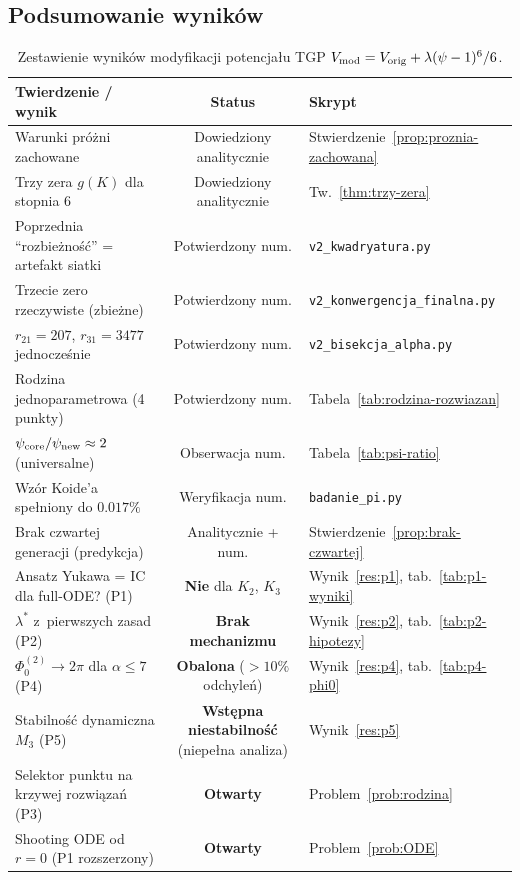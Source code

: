 \subsection{Podsumowanie wyników}%
\label{app:I-podsumowanie}

\begin{table}[h]
\centering
\small
\caption{Zestawienie wyników modyfikacji potencjału TGP
  $V_{\rm mod} = V_{\rm orig} + \lambda(\psi-1)^6/6$.}
\label{tab:podsumowanie-v2}
\begin{tabular}{@{}p{6.5cm}c p{4.5cm}@{}}
\toprule
\textbf{Twierdzenie / wynik} & \textbf{Status} & \textbf{Skrypt} \\
\midrule
Warunki próżni zachowane & Dowiedziony analitycznie
    & Stwierdzenie~\ref{prop:proznia-zachowana} \\
Trzy zera $g(K)$ dla stopnia 6 & Dowiedziony analitycznie
    & Tw.~\ref{thm:trzy-zera} \\
Poprzednia ``rozbieżność'' = artefakt siatki
    & Potwierdzony num.
    & \texttt{v2\_kwadryatura.py} \\
Trzecie zero rzeczywiste (zbieżne)
    & Potwierdzony num.
    & \texttt{v2\_konwergencja\_finalna.py} \\
$r_{21} = 207$, $r_{31} = 3477$ jednocześnie
    & Potwierdzony num.
    & \texttt{v2\_bisekcja\_alpha.py} \\
Rodzina jednoparametrowa (4 punkty)
    & Potwierdzony num.
    & Tabela~\ref{tab:rodzina-rozwiazan} \\
$\psi_{\rm core}/\psi_{\rm new} \approx 2$ (universalne)
    & Obserwacja num.
    & Tabela~\ref{tab:psi-ratio} \\
Wzór Koide'a spełniony do $0.017\%$
    & Weryfikacja num.
    & \texttt{badanie\_pi.py} \\
Brak czwartej generacji (predykcja)
    & Analitycznie + num.
    & Stwierdzenie~\ref{prop:brak-czwartej} \\
\midrule
Ansatz Yukawa = IC dla full-ODE? (P1)
    & \textbf{Nie} dla $K_2$, $K_3$
    & Wynik~\ref{res:p1}, tab.~\ref{tab:p1-wyniki} \\
$\lambda^*$ z~pierwszych zasad (P2)
    & \textbf{Brak mechanizmu}
    & Wynik~\ref{res:p2}, tab.~\ref{tab:p2-hipotezy} \\
$\Phi_0^{(2)} \to 2\pi$ dla $\alpha \leq 7$ (P4)
    & \textbf{Obalona} ($>10\%$ odchyleń)
    & Wynik~\ref{res:p4}, tab.~\ref{tab:p4-phi0} \\
Stabilność dynamiczna $M_3$ (P5)
    & \textbf{Wstępna niestabilność} (niepełna analiza)
    & Wynik~\ref{res:p5} \\
Selektor punktu na krzywej rozwiązań (P3)
    & \textbf{Otwarty}
    & Problem~\ref{prob:rodzina} \\
Shooting ODE od $r=0$ (P1 rozszerzony)
    & \textbf{Otwarty}
    & Problem~\ref{prob:ODE} \\
\bottomrule
\end{tabular}
\end{table}
